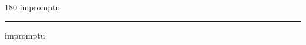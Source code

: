 
\begin{frame}
\begin{center}
\begin{turn}{180}
{\fontsize{2.5cm}{1em}\selectfont impromptu}
\end{turn}
\vspace{1em}\par  
\hrule
\vspace{1em}\par  
{\fontsize{2.5cm}{1em}\selectfont impromptu}
\end{center}
\end{frame}
